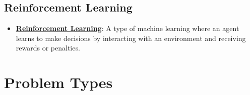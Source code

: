 \documentclass{article}%
\begin{document}
%
\subsection{Reinforcement Learning}%
\label{subsec:ReinforcementLearning}%
\begin{itemize}[leftmargin=*]%
\item \href{https://purdue.brightspace.com/d2l/common/assets/pdfjs-d2l-dist/1.0.14-legacy/web/viewer.html?file=%2Fcontent%2Fenforced%2F1095467-wl.202510.CS.24300.001%2F02L2-Intro.pdf%3Fou%3D1095467&lang=en-us&container=d2l-fileviewer-rendered-pdf&fullscreen=d2l-fileviewer-rendered-pdf-dialog&height=667#page=46}{\textbf{Reinforcement Learning}}: A type of machine learning where an agent learns to make decisions by interacting with an environment and receiving rewards or penalties.%
\end{itemize}

%
\section{Problem Types}%
\label{sec:ProblemTypes}%
\end{document}
